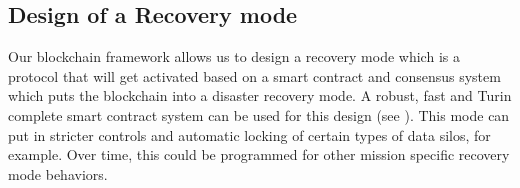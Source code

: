 \subsection{Design of a Recovery mode}

Our blockchain framework allows us to design a recovery mode which is a protocol that will get activated based on a 
smart contract and consensus system which puts the blockchain into a disaster recovery mode. A robust, fast and Turin
complete smart contract system can be used for this design (see \cite{kalodner2018}). This mode can put in 
stricter controls and automatic locking of certain types of data silos, for example. Over time, this could be programmed
for other mission specific recovery mode behaviors.
